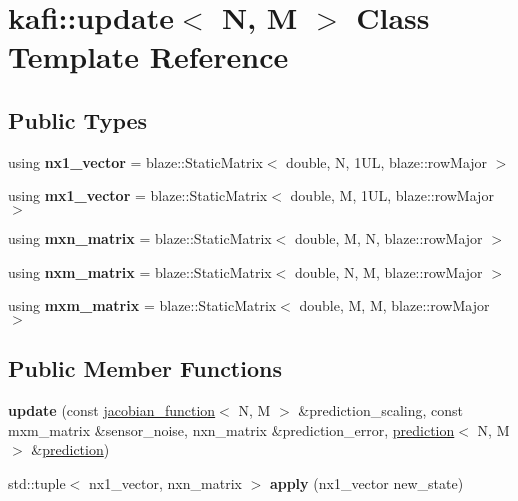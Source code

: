 \hypertarget{classkafi_1_1update}{}\section{kafi\+:\+:update$<$ N, M $>$ Class Template Reference}
\label{classkafi_1_1update}
\subsection*{Public Types}
\begin{DoxyCompactItemize}
\item 
\mbox{\label{classkafi_1_1update_a78607717dbf14d14cdb995a90cbd1705}} 
using {\bfseries nx1\+\_\+vector} = blaze\+::\+Static\+Matrix$<$ double, N, 1\+U\+L, blaze\+::row\+Major $>$
\item 
\mbox{\label{classkafi_1_1update_aaf0408a638fb5f3a256f3f74aba341e5}} 
using {\bfseries mx1\+\_\+vector} = blaze\+::\+Static\+Matrix$<$ double, M, 1\+U\+L, blaze\+::row\+Major $>$
\item 
\mbox{\label{classkafi_1_1update_a6ebe68465475eb615a253bfbbb2be28d}} 
using {\bfseries mxn\+\_\+matrix} = blaze\+::\+Static\+Matrix$<$ double, M, N, blaze\+::row\+Major $>$
\item 
\mbox{\label{classkafi_1_1update_ad61c623b89ac0330e6bc162847373091}} 
using {\bfseries nxm\+\_\+matrix} = blaze\+::\+Static\+Matrix$<$ double, N, M, blaze\+::row\+Major $>$
\item 
\mbox{\label{classkafi_1_1update_ac4ab079ae322dfca57a4f9a70266d3dd}} 
using {\bfseries mxm\+\_\+matrix} = blaze\+::\+Static\+Matrix$<$ double, M, M, blaze\+::row\+Major $>$
\end{DoxyCompactItemize}
\subsection*{Public Member Functions}
\begin{DoxyCompactItemize}
\item 
\mbox{\label{classkafi_1_1update_acc497b118654c3b8580d244cc57ec361}} 
{\bfseries update} (const \hyperlink{classkafi_1_1jacobian__function}{jacobian\+\_\+function}$<$ N, M $>$ \&prediction\+\_\+scaling, const mxm\+\_\+matrix \&sensor\+\_\+noise, nxn\+\_\+matrix \&prediction\+\_\+error, \hyperlink{classkafi_1_1prediction}{prediction}$<$ N, M $>$ \&\hyperlink{classkafi_1_1prediction}{prediction})
\item 
\mbox{\label{classkafi_1_1update_a1acdb6fb08bb5106df5190d1cd52c9b4}} 
std\+::tuple$<$ nx1\+\_\+vector, nxn\+\_\+matrix $>$ {\bfseries apply} (nx1\+\_\+vector new\+\_\+state)
\end{DoxyCompactItemize}
